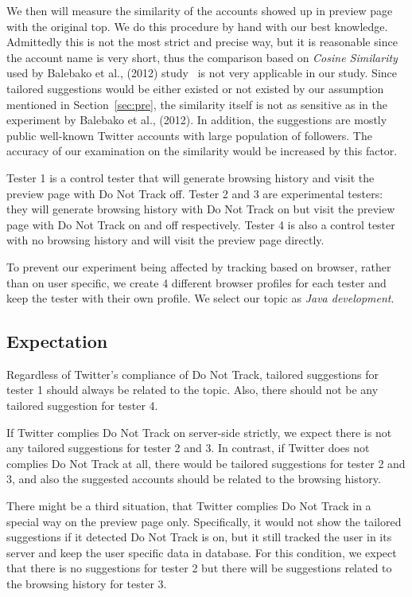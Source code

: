 \documentclass{sig-alternate}
\begin{document}
We then will measure the similarity of the accounts showed up in preview page with the original top. We do this procedure by hand with our best knowledge. Admittedly this is not the most strict and precise way, but it is reasonable since the account name is very short, thus the comparison based on \emph{Cosine Similarity} used by Balebako et al., (2012) study~\cite{balebako2012measuring} is not very applicable in our study. Since tailored suggestions would be either existed or not existed by our assumption mentioned in Section~\ref{sec:pre}, the similarity itself is not as sensitive as in the experiment by Balebako et al., (2012). In addition, the suggestions are mostly public well-known Twitter accounts with large population of followers. The accuracy of our examination on the similarity would be increased by this factor.

Tester 1 is a control tester that will generate browsing history and visit the preview page with Do Not Track off. Tester 2 and 3 are experimental testers: they will generate browsing history with Do Not Track on but visit the preview page with Do Not Track on and off respectively. Tester 4 is also a control tester with no browsing history and will visit the preview page directly.

To prevent our experiment being affected by tracking based on browser, rather than on user specific, we create 4 different browser profiles for each tester and keep the tester with their own profile. We select our topic as \emph{Java development}.

\subsection{Expectation} \label{sec:expect}

Regardless of Twitter's compliance of Do Not Track, tailored suggestions for tester 1 should always be related to the topic. Also, there should not be any tailored suggestion for tester 4.

If Twitter complies Do Not Track on server-side strictly, we expect there is not any tailored suggestions for tester 2 and 3. In contrast, if Twitter does not complies Do Not Track at all, there would be tailored suggestions for tester 2 and 3, and also the suggested accounts should be related to the browsing history.

There might be a third situation, that Twitter complies Do Not Track in a special way on the preview page only. Specifically, it would not show the tailored suggestions if it detected Do Not Track is on, but it still tracked the user in its server and keep the user specific data in database. For this condition, we expect that there is no suggestions for tester 2 but there will be suggestions related to the browsing history for tester 3.
\end{document}
